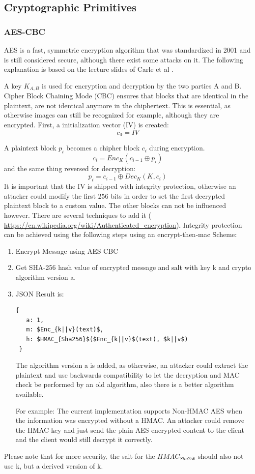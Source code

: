 \documentclass{scrartcl}
\begin{document}
 
\subsection{Cryptographic Primitives}
\subsubsection{AES-CBC \label{AESCBC}}
AES is a fast, symmetric encryption algorithm that was standardized in 2001 and is still considered secure, although there exist some attacks on it. The following explanation is based on the lecture slides of Carle et al \cite{carle}.

A key $K_{A,B}$ is used for encryption and decryption by the two parties A and B. 
Cipher Block Chaining Mode (CBC) ensures that blocks that are identical in the plaintext, are not identical anymore in the chiphertext. This is essential, as otherwise images can still be recognized for example, although they are encrypted. First, a initialization vector (IV) is created:
$$
c_0 = IV
$$

A plaintext block $p_i$ becomes a chipher block $c_i$ during encryption.
$$
c_i = Enc_K(c_{i-1} \oplus p_i)
$$
and the same thing reversed for decryption:
$$
p_i = c_{i-1} \oplus Dec_K(K, c_i)
$$
It is important that the IV is shipped with integrity protection, otherwise an attacker could modify the first 256 bits in order to set the first decrypted plaintext block to a custom value. The other blocks can not be influenced however. 
There are several techniques to add it (
\url{https://en.wikipedia.org/wiki/Authenticated_encryption}).
 Integrity protection can be achieved using the following steps using an encrypt-then-mac Scheme:
\begin{enumerate}
\item Encrypt Message using AES-CBC
\item Get SHA-256 hash value of encrypted message and salt with key k and crypto algorithm version a.
\item JSON Result is:
\begin{lstlisting}[mathescape]
 { 
   a: 1,
   m: $Enc_{k||v}(text)$,
   h: $HMAC_{Sha256}$($Enc_{k||v}$(text), $k||v$)
 }
 \end{lstlisting}
  The algorithm version a is added, as otherwise, an attacker could extract the plaintext and use backwards compatibility to let the decryption and MAC check be performed by an old algorithm, also there is a better algorithm available.

For example: The current implementation supports Non-HMAC AES when the information was encrypted without a HMAC. An attacker could remove the HMAC key and just send the plain AES encrypted content to the client and the client would still decrypt it correctly.

\end{enumerate}
Please note that for more security, the salt for the $HMAC_{Sha256}$ should also not use k, but a derived version of k.
\end{document}
